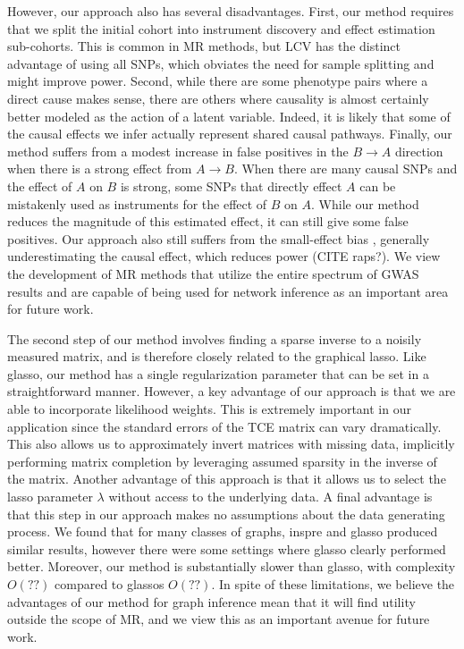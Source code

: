 \documentclass{article}
\begin{document}
However, our approach also has several disadvantages. First, our method
requires that we split the initial cohort into instrument discovery and
effect estimation sub-cohorts. This is common in MR methods, but LCV has
the distinct advantage of using all SNPs, which obviates the need
for sample splitting and might improve power. Second, while there are some
phenotype pairs where a direct cause makes sense, there are others where causality is 
almost certainly better modeled as the action of a latent variable. Indeed, it is likely
that some of the causal effects we infer actually represent shared causal pathways.
Finally, our method suffers from a modest increase in false positives in the $B\rightarrow A$
direction when there is a strong effect from $A\rightarrow B$. When there are many
causal SNPs and the effect of $A$ on $B$ is strong, some SNPs that directly effect $A$
can be mistakenly used as instruments for the effect of $B$ on $A$. While our method
reduces the magnitude of this estimated effect, it can still give some false positives.
Our approach also still suffers from the small-effect bias , generally underestimating
the causal effect, which reduces power (CITE raps?).
We view the development of MR methods that utilize the entire spectrum of GWAS results and are
capable of being used for network inference as an important
area for future work.

The second step of our method involves finding a sparse inverse to a noisily measured
matrix, and is therefore closely related to the graphical lasso. Like glasso, our method
 has a single regularization parameter that can be set in a straightforward manner.
However, a key advantage of our approach is that we are able to incorporate
likelihood weights. This is extremely important in our application since the standard errors
of the TCE matrix can vary dramatically. This also allows us to approximately invert matrices
with missing data, implicitly performing matrix completion by leveraging assumed
sparsity in the inverse of the matrix. Another advantage
of this approach is that it allows us to select the lasso parameter $\lambda$ without
access to the underlying data. A final advantage is that this step in our approach makes no
assumptions about the data generating process. We found that for many classes of graphs,
inspre and glasso produced similar results, however there were some settings where glasso
clearly performed better. Moreover, our method is substantially slower than glasso, with
complexity $O(??)$ compared to glassos $O(??)$. In spite of these limitations,
we believe the advantages of our method for graph inference mean that it will find utility
outside the scope of MR, and we view this as an important avenue for future work.
\end{document}
